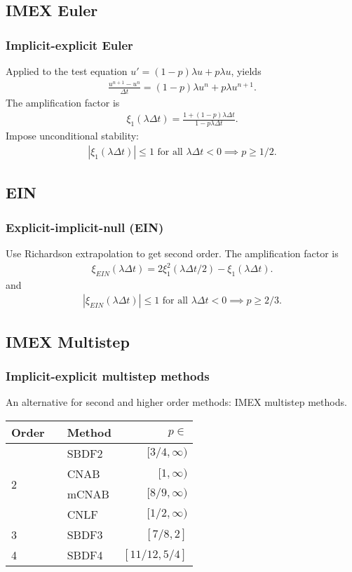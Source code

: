 \documentclass[hyperref={pdfpagelabels=false}]{beamer}
\begin{document}
\subsection{IMEX Euler}
\begin{frame}
	\frametitle{Implicit-explicit Euler} 
Applied to the test equation $u' = (1-p)\lambda u + p\lambda u$, yields 
\begin{align*}
\frac{u^{n+1} - u^n}{\Delta t} = (1-p)\lambda u^n + p\lambda u^{n+1}.
\end{align*}
The amplification factor is 
\begin{align*}
\xi_1(\lambda\Delta t) 
= \frac{1 + (1-p)\lambda\Delta t}{1 - p\lambda\Delta t}. 
\end{align*}
Impose unconditional stability: 
\begin{align*}
\left\vert \xi_1(\lambda\Delta t)\right \vert \leq 1  
\text{ for all }\lambda \Delta t < 0 \implies p \geq 1/2.
\end{align*}
\end{frame}
\subsection{EIN} 
\begin{frame}
	\frametitle{Explicit-implicit-null (EIN)} 
Use Richardson extrapolation to get second order. The amplification factor is  	
\begin{align*}
\xi_{EIN}(\lambda\Delta t) 
= 2\xi^2_1(\lambda\Delta t/2) - \xi_1(\lambda\Delta t).
\end{align*}
and 
\begin{align*}
\left\vert \xi_{EIN}(\lambda\Delta t) \right\vert \leq 1 \text{ for all } \lambda\Delta t < 0 \implies p \geq 2/3.
\end{align*}
\end{frame}
\subsection{IMEX Multistep}
\begin{frame}
	\frametitle{Implicit-explicit multistep methods}
An alternative for second and higher order methods: IMEX multistep methods.	
\begin{table}[htb!]
	\centering  
	\begin{tabular}{lllr}
		\toprule
		Order && Method & $p\in$
		\\ \midrule 
		\multirow{4}{*}{2} && SBDF2 & $[3/4,\infty)$
		\\
		&& CNAB & $[1,\infty)$ 
		\\
		&& mCNAB & $[8/9,\infty)$ 
		\\
		&& CNLF & $[1/2,\infty)$
		\\ \cmidrule{1-3}
		3 && SBDF3 & $[7/8,2]$ 
		\\ \cmidrule{1-3}
		4 && SBDF4 & $[11/12,5/4]$
		\\
		\bottomrule
	\end{tabular}
\end{table}
\end{frame}
\end{document}
